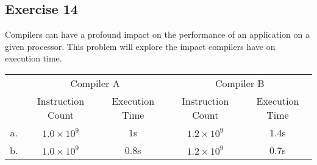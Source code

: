 \documentclass[12pt]{article}
\begin{document}
\subsection*{Exercise 14}
Compilers can have a profound impact on the performance of an application on a given processor. This problem will explore the impact compilers have on execution time.
\begin{center}
\begin{tabular}{| c | c | c | c | c |}
\hline
\multirow{2}{*}{} & \multicolumn{2}{|c|}{Compiler A} & \multicolumn{2}{|c|}{Compiler B} \\
\cline{2-5}
& Instruction Count & Execution Time & Instruction Count & Execution Time \\
\hline
a. & $1.0\times10^9$ & 1s & $1.2\times10^9$ & 1.4s \\
\hline
b. & $1.0\times10^9$ & 0.8s & $1.2\times10^9$ & 0.7s \\
\hline
\end{tabular}
\end{center}
\end{document}
